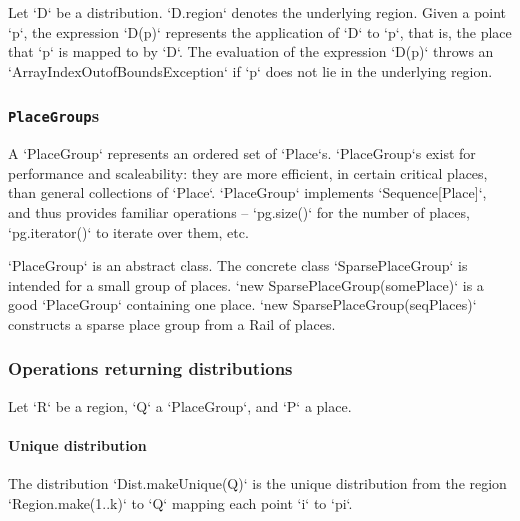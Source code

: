 Let \xcd`D` be a distribution. 
\xcd`D.region` 
denotes the underlying
region. 
Given a point \xcd`p`, the expression
\xcd`D(p)` represents the application of \xcd`D` to \xcd`p`, that is,
the place that \xcd`p` is mapped to by \xcd`D`. The evaluation of the
expression \xcd`D(p)` throws an \xcd`ArrayIndexOutofBoundsException`
if \xcd`p` does not lie in the underlying region.


\subsubsection{{\tt PlaceGroup}s}

A \xcd`PlaceGroup` represents an ordered set of \xcd`Place`s.
\xcd`PlaceGroup`s exist for performance and scaleability: they are more
efficient, in certain critical places, than general collections of
\xcd`Place`. \xcd`PlaceGroup` implements \xcd`Sequence[Place]`, and thus
provides familiar operations -- \xcd`pg.size()` for the number of places,
\xcd`pg.iterator()` to iterate over them, etc.  

\xcd`PlaceGroup` is an abstract class.  The concrete class
\xcd`SparsePlaceGroup` is intended for a small group of places. 
\xcd`new SparsePlaceGroup(somePlace)` is a good \xcd`PlaceGroup` containing
one place.  
\xcd`new SparsePlaceGroup(seqPlaces)`
constructs a sparse place group from a Rail of places.

\subsubsection{Operations returning distributions}



Let \xcd`R` be a region, \xcd`Q` 
a \xcd`PlaceGroup`, and \xcd`P` a place.

\paragraph{Unique distribution} 
The distribution \xcd`Dist.makeUnique(Q)` is the unique distribution from the
region \xcd`Region.make(1..k)` to \xcd`Q` mapping each point \xcd`i` to
\xcd`pi`.


